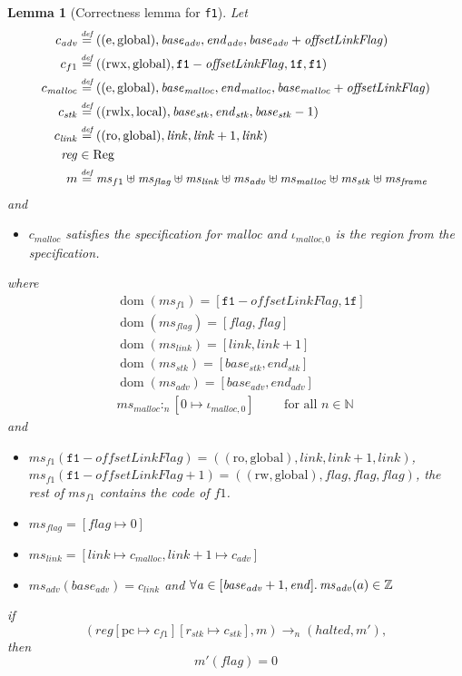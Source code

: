 \documentclass[compsoc,conference,letterpaper,fleqn]{IEEEtran}
\newtheorem{lemma}{Lemma}
\newcommand{\update}[2]{[#1 \mapsto #2]}
\newcommand{\defeq}{\stackrel{\textit{\tiny{def}}}{=}}
\DeclareMathOperator{\dom}{dom}
\newcommand{\var}[1]{\mathit{#1}}
\newcommand{\hs}{\var{ms}}
\newcommand{\ms}{\hs}
\newcommand{\pcreg}{\mathrm{pc}}
\newcommand{\addr}{\var{a}}
\newcommand{\start}{\var{base}}
\newcommand{\addrend}{\var{end}}
\newcommand{\reg}{\var{reg}}
\newcommand{\heap}{\var{mem}}
\newcommand{\adv}{\var{adv}}
\newcommand{\link}{\var{link}}
\newcommand{\stk}{\var{stk}}
\newcommand{\flag}{\var{flag}}
\newcommand{\olf}{\var{offsetLinkFlag}}
\newcommand{\halted}{\mathit{halted}}
\newcommand{\heapSat}[3][\heap]{#1 :_{#2} #3}
\newcommand{\codelabel}[1]{\mathit{#1}}
\newcommand{\malloc}{\codelabel{malloc}}
\newcommand{\plaindom}[1]{\mathrm{#1}}
\newcommand{\Regs}{\plaindom{Reg}}
\newcommand{\nats}{\mathbb{N}}
\newcommand{\ints}{\mathbb{Z}}
\newcommand{\plainperm}[1]{\mathrm{#1}}
\newcommand{\readonly}{\plainperm{ro}}
\newcommand{\readwrite}{\plainperm{rw}}
\newcommand{\entry}{\plainperm{e}}
\newcommand{\rwx}{\plainperm{rwx}}
\newcommand{\rwlx}{\plainperm{rwlx}}
\newcommand{\local}{\plainperm{local}}
\newcommand{\glob}{\plainperm{global}}
\newcommand{\step}[1][]{\rightarrow_{#1}}
\begin{document}
\begin{lemma}[Correctness lemma for \texttt{f1}]
  \label{lem:correctness-f1}
  Let
  \begin{align*}
    c_{\var{adv}} & \defeq ((\entry,\glob),\start_{\adv},\addrend_{\adv},\start_{\adv}+\olf) \\
    c_{f1} & \defeq ((\rwx,\glob),\mathtt{f1}-\olf,\mathtt{1f},\mathtt{f1}) \\
    c_\malloc & \defeq ((\entry,\glob),\start_\malloc,\addrend_\malloc,\start_\malloc+\olf) \\
    c_{\var{stk}} & \defeq ((\rwlx,\local),\start_\stk,\addrend_\stk,\start_\stk-1) \\
    c_\link & \defeq ((\readonly,\glob),\link,\link+1,\link)\\
    \reg & \in \Regs \\
    m & \defeq \hs_{f1} \uplus 
        \hs_\flag \uplus                
        \ms_{\var{link}} \uplus 
        \hs_\adv \uplus 
        \ms_{\malloc} \uplus 
        \ms_{\var{stk}} \uplus
        \ms_{\var{frame}} 
  \end{align*}
  and
  \begin{itemize}
  \item $c_\malloc$ satisfies the specification for malloc and $\iota_{\malloc,0}$ is the region from the specification.
  \end{itemize}
  where 
  \begin{align*}
    &\dom(\hs_{f1}) = [\mathtt{f1}-\olf,\mathtt{1f}] \\
    &\dom(\hs_\flag) = [\flag,\flag] \\
    &\dom(\ms_\link) = [\link,\link+1]\\
    &\dom(\ms_\stk) = [\start_\stk, \addrend_\stk]\\
    &\dom(\hs_{\adv}) = [\start_\adv,\addrend_\adv] \\
    &\heapSat[\hs_{\malloc}]{n}{[0 \mapsto \iota_{\malloc,0}]} \qquad \text{ for all $n \in \nats$}
  \end{align*}
  and
  \begin{itemize}
  \item $\ms_{f1}(\mathtt{f1}-\olf) = ((\readonly,\glob),\link,\link+1,\link)$, $\ms_{f1}(\mathtt{f1}-\olf+1) = ((\readwrite,\glob),\flag,\flag,\flag)$, the rest of $\hs_{f1}$ contains the code of $f1$.
  \item $\ms_\flag = [\flag \mapsto 0]$
  \item $\ms_{\var{link}} = [\var{link} \mapsto c_\malloc, \var{link} + 1 \mapsto c_\adv]$
  \item $\hs_\adv(\start_\adv) = c_\link$ and $\forall \addr \in [\start_\adv+1,\addrend]\ldotp \ms_\adv(a) \in \ints$
  \end{itemize}
  if 
  \[
    (\reg\update{\pcreg}{c_{f1}}\update{r_\stk}{c_\stk},m) \step[n] (\halted,m'),
  \]
  then
  \[
    m'(\flag) = 0
  \]  
\end{lemma}
\end{document}
